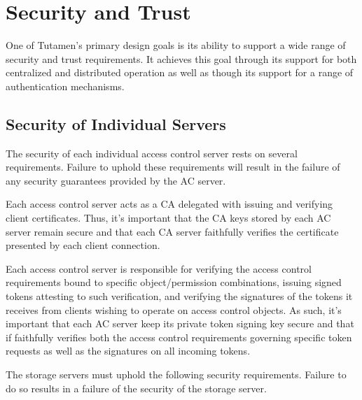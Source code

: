 \section{Security and Trust}
\label{sec:trust}

One of Tutamen's primary design goals is its ability to support a wide
range of security and trust requirements. It achieves this goal
through its support for both centralized and distributed operation as
well as though its support for a range of authentication mechanisms.

\subsection{Security of Individual Servers}

The security of each individual access control server rests on several
requirements. Failure to uphold these requirements will result in the
failure of any security guarantees provided by the AC server.

\begin{packed_desc}
\item[Certificate Authority Role:] Each access control server acts as
  a CA delegated with issuing and verifying client certificates. Thus,
  it's important that the CA keys stored by each AC server remain
  secure and that each CA server faithfully verifies the certificate
  presented by each client connection.
\item[Token Issuance and Verification:] Each access control server is
  responsible for verifying the access control requirements bound to
  specific object/permission combinations, issuing signed tokens
  attesting to such verification, and verifying the signatures of the
  tokens it receives from clients wishing to operate on access control
  objects. As such, it's important that each AC server keep its
  private token signing key secure and that if faithfully verifies
  both the access control requirements governing specific token
  requests as well as the signatures on all incoming tokens.
\end{packed_desc}

The storage servers must uphold the following security
requirements. Failure to do so results in a failure of the security of
the storage server.

